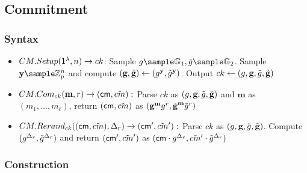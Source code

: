 \newcommand{\vt}{\mathsf{vt}}
\newcommand{\wx}{\mathsf{wx}}
\newcommand{\wxone}{\mathsf{w_1x}}
\newcommand{\wxtwo}{\mathsf{w_2x}}
\newcommand{\wxhat}{\mathsf{\hat{w}x}}

\newcommand{\acu}{\mathsf{ACU}}
\newcommand{\acusetup}{\mathsf{ACU.Setup}}
\newcommand{\acuadd}{\mathsf{ACU.Add}}
\newcommand{\acudel}{\mathsf{ACU.Del}}
\newcommand{\acuvermem}{\mathsf{ACU.VerMem}}
\newcommand{\acuvernonmem}{\mathsf{ACU.VerNonMem}}


\newcommand{\rev}{\mathsf{REV}}
\newcommand{\revsetup}{\mathsf{REV.Setup}}
\newcommand{\revrevoke}{\mathsf{REV.Revoke}}
\newcommand{\revtokengen}{\mathsf{REV.TokenGen}}
\newcommand{\revtokenver}{\mathsf{REV.TokenVer}}

\newcommand{\rt}{\mathsf{rt}}

\newcommand{\tilcm}{\tilde{cm}}


\newcommand{\mb}{\textbf{m}}
\newcommand{\gb}{\textbf{g}}
\newcommand{\tilgb}{\tilde{\textbf{g}}}
\newcommand{\yb}{\textbf{y}}
\newcommand{\rd}{\Delta_r}
\newcommand{\td}{\Delta_t}
\newcommand{\ud}{\Delta_u}


\subsection{Commitment}
\subsubsection{Syntax}
\begin{itemize}
    \item $CM.Setup(\mathsf{1^{\lambda}}, n) \to ck$: Sample $g \sample \G_1, \tilg \sample \G_2$. Sample $\yb \sample \Z_p^{n}$ and compute $(\gb, \tilgb) \gets (g^{\yb}, \tilg^{\yb})$. Output $ck \gets (g, \gb, \tilg, \tilgb)$
    
    \item $CM.Com_{ck}(\mb, r) \to (\cm, \tilcm):$ Parse $ck$ as $(g, \gb, \tilg, \tilgb)$ and $\mb$ as $(m_1, \dots, m_{\ell})$, return $(\cm, \tilcm)$ as $(\gb^{\mb}g^r, \tilgb^{\mb}\tilg^r)$

    \item $CM.Rerand_{ck}((\cm, \tilcm), \rd) \to (\cm', \tilcm'):$ Parse $ck$ as $(g, \gb, \tilg, \tilgb)$. Compute $(g^{\rd}, \tilg^{\rd})$ and return $(\cm', \tilcm')$ as $(\cm \cdot g^{\rd}, \tilcm' \cdot \tilg^{\rd})$
\end{itemize}

\subsubsection{Construction}

